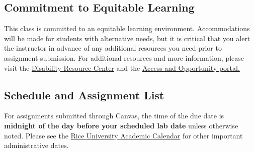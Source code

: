 \documentclass{article}
\begin{document}
\subsection*{Commitment to Equitable Learning}
This class is committed to an equitable learning environment. Accommodations will be made for students with alternative needs, but it is critical that you alert the instructor in advance of any additional resources you need prior to assignment submission. For additional resources and more information, please visit the \href{https://drc.rice.edu/}{Disability Resource Center} and the \href{https://aop.rice.edu/}{Access and Opportunity portal.}
\pagebreak
\subsection*{Schedule and Assignment List}
For assignments submitted through Canvas, the time of the due date is \textbf{midnight of the day before your scheduled lab date} unless otherwise noted. Please see the \href{https://registrar.rice.edu/calendars/spring-semester-2023}{Rice University Academic Calendar} for other important administrative dates.\\
\end{document}
